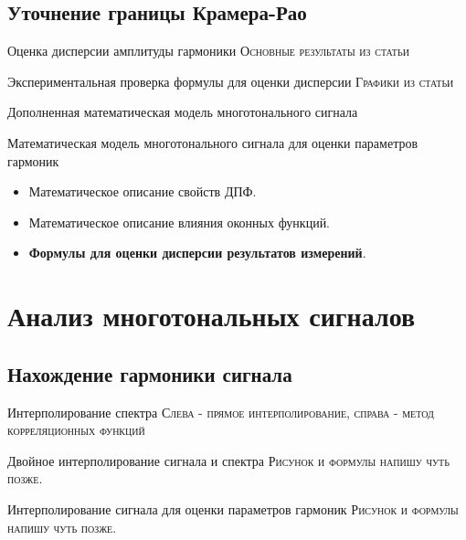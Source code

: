 \subsection{Уточнение границы Крамера-Рао}
\begin{frame}{Оценка дисперсии амплитуды гармоники}
	\textsc{Основные результаты из статьи}
\end{frame}

\begin{frame}{Экспериментальная проверка формулы для оценки дисперсии}
	\textsc{Графики из статьи}
\end{frame}

\begin{frame}{Дополненная математическая модель многотонального сигнала}
    \begin{center}
		\Large
		Математическая модель многотонального сигнала для оценки параметров гармоник
	\end{center}	
	\begin{itemize}
		\item Математическое описание свойств ДПФ.
		\item Математическое описание влияния оконных функций.
		\item \textbf{Формулы для оценки дисперсии результатов измерений}.
	\end{itemize}
\end{frame}

\section{Анализ многотональных сигналов}

\subsection{Нахождение гармоники сигнала}
\begin{frame}{Интерполирование спектра}
	\textsc{Слева - прямое интерполирование, справа - метод корреляционных функций}
\end{frame}

\begin{frame}{Двойное интерполирование сигнала и спектра}
	\textsc{Рисунок и формулы напишу чуть позже.}
\end{frame}

\begin{frame}{Интерполирование сигнала для оценки параметров гармоник}
	\textsc{Рисунок и формулы напишу чуть позже.}
\end{frame}

